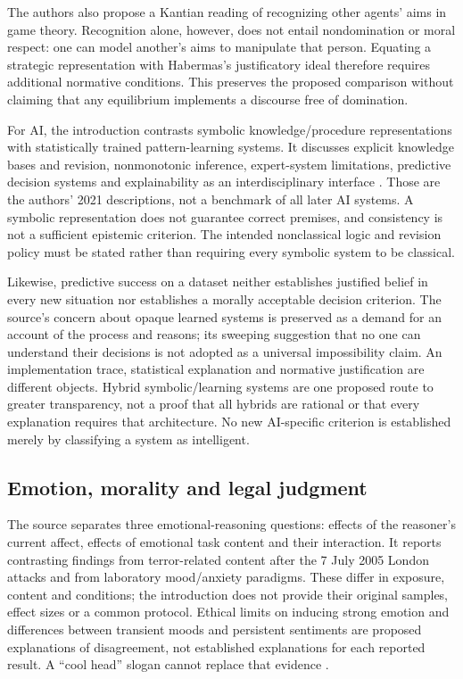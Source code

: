 The authors also propose a Kantian reading of recognizing other
agents' aims in game theory. Recognition alone, however, does not
entail nondomination or moral respect: one can model another's aims
to manipulate that person. Equating a strategic representation with
Habermas's justificatory ideal therefore requires additional normative
conditions. This preserves the proposed comparison without claiming
that any equilibrium implements a discourse free of domination.

For AI, the introduction contrasts symbolic knowledge/procedure
representations with statistically trained pattern-learning systems.
It discusses explicit knowledge bases and revision, nonmonotonic
inference, expert-system limitations, predictive decision systems and
explainability as an interdisciplinary interface
\cite[pp.~46--47]{KnauffSpohn2021FrameworksIntro}.
Those are the authors' 2021 descriptions, not a benchmark of all later
AI systems. A symbolic representation does not guarantee correct
premises, and consistency is not a sufficient epistemic criterion.
The intended nonclassical logic and revision policy must be stated
rather than requiring every symbolic system to be classical.

Likewise, predictive success on a dataset neither establishes justified
belief in every new situation nor establishes a morally acceptable
decision criterion. The source's concern about opaque learned systems
is preserved as a demand for an account of the process and reasons;
its sweeping suggestion that no one can understand their decisions
is not adopted as a universal impossibility claim. An implementation
trace, statistical explanation and normative justification are different
objects. Hybrid symbolic/learning systems are one proposed route to
greater transparency, not a proof that all hybrids are rational or
that every explanation requires that architecture. No new AI-specific
criterion is established merely by classifying a system as intelligent.

\subsection{Emotion, morality and legal judgment}

The source separates three emotional-reasoning questions: effects of
the reasoner's current affect, effects of emotional task content and
their interaction. It reports contrasting findings from terror-related
content after the 7 July 2005 London attacks and from laboratory
mood/anxiety paradigms. These differ in exposure, content and conditions;
the introduction does not provide their original samples, effect sizes
or a common protocol. Ethical limits on inducing strong emotion and
differences between transient moods and persistent sentiments are
proposed explanations of disagreement, not established explanations
for each reported result. A ``cool head'' slogan cannot replace
that evidence \cite[pp.~47--48]{KnauffSpohn2021FrameworksIntro}.

